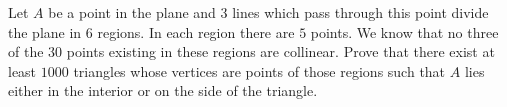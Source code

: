 Let $A$ be a point in the plane and $3$ lines which pass through this point divide the plane in $6$ regions.
In each region there are $5$ points. We know that no three of the $30$ points existing in these regions are collinear. Prove that there exist at least $1000$ triangles whose vertices are points of those regions such that $A$ lies either in the interior or on the side of the triangle.